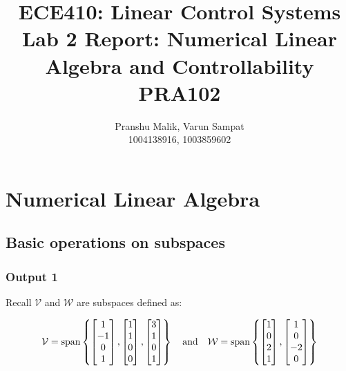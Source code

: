 \documentclass[10pt]{article}
\date{}
\begin{document}
\title{\textbf{\Large{\textsc{ECE410:} Linear Control Systems}} \\ \Large{Lab 2 Report: Numerical Linear Algebra and Controllability} \\ \textbf{\small{PRA102}}\vspace{-0.3cm}}
\author{Pranshu Malik, Varun Sampat \\ \footnotesize{1004138916}, \footnotesize{1003859602}\vspace{-3cm}}

\maketitle

\section{Numerical Linear Algebra}
\subsection{Basic operations on subspaces}
\subsubsection{Output 1}
Recall $ \mathcal{V} $ and $ \mathcal{W} $ are subspaces defined as:

\begin{equation*}
    \mathcal{V} = \text{span}
    \begin{Bmatrix}
        \begin{bmatrix} 1\\-1\\0\\1 \end{bmatrix},
        \begin{bmatrix} 1\\1\\0\\0 \end{bmatrix},
        \begin{bmatrix} 3\\1\\0\\1 \end{bmatrix}
    \end{Bmatrix}
    \quad
    \text{and}
    \quad
    \mathcal{W} = \text{span}
    \begin{Bmatrix}
        \begin{bmatrix} 1\\0\\2\\1 \end{bmatrix},
        \begin{bmatrix} 1\\0\\-2\\0 \end{bmatrix}
    \end{Bmatrix}
\end{equation*}
\end{document}

